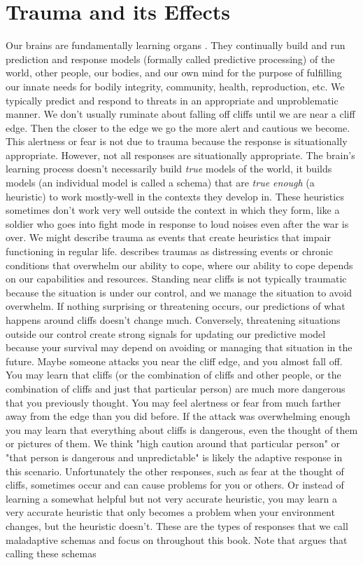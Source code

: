 \documentclass[12pt,letterpaper]{book}
\begin{document}
\section{Trauma and its Effects}
\label{sec:trauma}
Our brains are fundamentally learning organs \cite{eckerUnlocking,clark2015surfing}. They continually build and run prediction and response models (formally called predictive processing) of the world, other people, our bodies, and our own mind for the purpose of fulfilling our innate needs for bodily integrity, community, health, reproduction, etc. We typically predict and respond to threats in an appropriate and unproblematic manner. We don't usually ruminate about falling off cliffs until we are near a cliff edge. Then the closer to the edge we go the more alert and cautious we become. This alertness or fear is not due to trauma because the response is situationally appropriate. However, not all responses are situationally appropriate. The brain's learning process doesn't necessarily build \textit{true} models of the world, it builds models (an individual model is called a schema) that are \textit{true enough} (a heuristic) to work mostly-well in the contexts they develop in. These heuristics sometimes don't work very well outside the context in which they form, like a soldier who goes into fight mode in response to loud noises even after the war is over. We might describe trauma as events that create heuristics that impair functioning in regular life. \textcite{laneReconsolidation} describes traumas as distressing events or chronic conditions that overwhelm our ability to cope, where our ability to cope depends on our capabilities and resources. Standing near cliffs is not typically traumatic because the situation is under our control, and we manage the situation to avoid overwhelm. If nothing surprising or threatening occurs, our predictions of what happens around cliffs doesn't change much. Conversely, threatening situations outside our control create strong signals for updating our predictive model because your survival may depend on avoiding or managing that situation in the future. Maybe someone attacks you near the cliff edge, and you almost fall off. You may learn that cliffs (or the combination of cliffs and other people, or the combination of cliffs and just that particular person) are much more dangerous that you previously thought. You may feel alertness or fear from much farther away from the edge than you did before. If the attack was overwhelming enough you may learn that everything about cliffs is dangerous, even the thought of them or pictures of them. We think "high caution around that particular person" or "that person is dangerous and unpredictable" is likely the adaptive response in this scenario. Unfortunately the other responses, such as fear at the thought of cliffs, sometimes occur and can cause problems for you or others. Or instead of learning a somewhat helpful but not very accurate heuristic, you may learn a very accurate heuristic that only becomes a problem when your environment changes, but the heuristic doesn't. These are the types of responses that we call maladaptive schemas and focus on throughout this book. Note that \textcite{eckerUnlocking} argues that calling these schemas 
\end{document}
